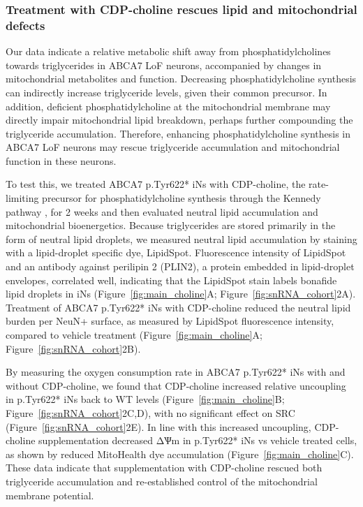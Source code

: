 \subsubsection{Treatment with CDP-choline rescues lipid and mitochondrial defects}
Our data indicate a relative metabolic shift away from phosphatidylcholines towards triglycerides in ABCA7 LoF neurons, accompanied by changes in mitochondrial metabolites and function. Decreasing phosphatidylcholine synthesis can indirectly increase triglyceride levels, given their common precursor\cite{Farese2023-bb}.  In addition, deficient phosphatidylcholine at the mitochondrial membrane may directly impair mitochondrial lipid breakdown, perhaps further compounding the triglyceride accumulation\cite{Schuler2016-tr,Szymkowicz2019-be,Mejia2015-tw,Prola2021-uz}. Therefore, enhancing phosphatidylcholine synthesis in ABCA7 LoF neurons may rescue triglyceride accumulation and mitochondrial function in these neurons.

To test this, we treated ABCA7 p.Tyr622* iNs with CDP-choline, the rate-limiting precursor for phosphatidylcholine synthesis through the Kennedy pathway \cite{Zeisel2009-xv,Son2024-tu}, for 2 weeks and then evaluated neutral lipid accumulation and mitochondrial bioenergetics. Because triglycerides are stored primarily in the form of neutral lipid droplets\cite{noauthor_2024-sd}, we measured neutral lipid accumulation by staining with a lipid-droplet specific dye, LipidSpot. Fluorescence intensity of  LipidSpot and an antibody against perilipin 2 (PLIN2), a protein embedded in lipid-droplet envelopes\cite{Olzmann2019-qv}, correlated well, indicating that the LipidSpot stain labels bonafide lipid droplets in iNs (Figure~\ref{fig:main_choline}A; Figure~\ref{fig:snRNA_cohort}2A). Treatment of ABCA7 p.Tyr622* iNs with CDP-choline reduced the neutral lipid burden per NeuN+ surface, as measured by LipidSpot fluorescence intensity, compared to vehicle treatment (Figure~\ref{fig:main_choline}A; Figure~\ref{fig:snRNA_cohort}2B). 

By measuring the oxygen consumption rate in ABCA7 p.Tyr622* iNs with and without CDP-choline, we found that CDP-choline increased relative uncoupling in p.Tyr622* iNs back to WT levels (Figure~\ref{fig:main_choline}B; Figure~\ref{fig:snRNA_cohort}2C,D), with no significant effect on SRC (Figure~\ref{fig:snRNA_cohort}2E). In line with this increased uncoupling, CDP-choline supplementation decreased ΔѰm in p.Tyr622* iNs vs vehicle treated cells, as shown by reduced MitoHealth dye accumulation (Figure~\ref{fig:main_choline}C). These data indicate that supplementation with CDP-choline rescued both triglyceride accumulation and re-established control of the mitochondrial membrane potential. 

